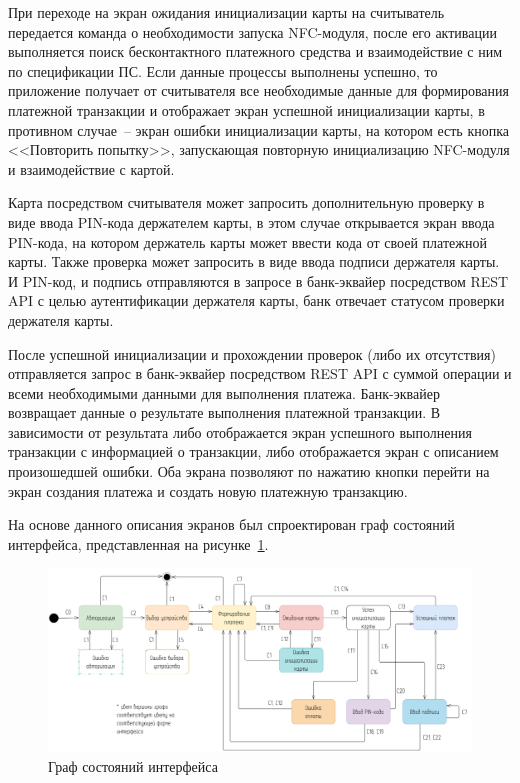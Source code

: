 При переходе на экран ожидания инициализации карты на считыватель передается команда о необходимости запуска NFC-модуля, после его активации выполняется поиск бесконтактного платежного средства и взаимодействие с ним по спецификации ПС.
Если данные процессы выполнены успешно, то приложение получает от считывателя все необходимые данные для формирования платежной транзакции и отображает экран успешной инициализации карты, в противном случае~-- экран ошибки инициализации карты, на котором есть кнопка <<Повторить попытку>>, запускающая повторную инициализацию NFC-модуля и взаимодействие с картой.

Карта посредством считывателя может запросить дополнительную проверку в виде ввода PIN-кода держателем карты, в этом случае открывается экран ввода PIN-кода, на котором держатель карты может ввести кода от своей платежной карты.
Также проверка может запросить в виде ввода подписи держателя карты.
И PIN-код, и подпись отправляются в запросе в банк-эквайер посредством REST API с целью аутентификации держателя карты, банк отвечает статусом проверки держателя карты.

После успешной инициализации и прохождении проверок (либо их отсутствия) отправляется запрос в банк-эквайер посредством REST API с суммой операции и всеми необходимыми данными для выполнения платежа.
Банк-эквайер возвращает данные о результате выполнения платежной транзакции.
В зависимости от результата либо отображается экран успешного выполнения транзакции с информацией о транзакции, либо отображается экран с описанием произошедшей ошибки.
Оба экрана позволяют по нажатию кнопки перейти на экран создания платежа и создать новую платежную транзакцию.


На основе данного описания экранов был спроектирован граф состояний интерфейса, представленная на рисунке~\ref{fig:nav_graph}.

\begin{figure}[h]
    \centering
    \includegraphics[width=1\textwidth]{images/design/nav_graph}
    \caption{\centering Граф состояний интерфейса}
    \label{fig:nav_graph}
\end{figure}

